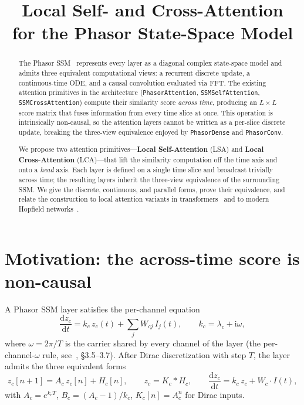 \documentclass[11pt]{article}
\title{Local Self- and Cross-Attention\\
for the Phasor State-Space Model}
\author{}
\date{}
\newcommand{\im}{\mathrm{i}}
\newcommand{\dd}{\mathrm{d}}
\theoremstyle{definition}
\begin{document}
\maketitle

\begin{abstract}
\noindent
The Phasor SSM~\cite{phasor-ssm-derivation} represents every layer as a
diagonal complex state-space model and admits three equivalent
computational views: a recurrent discrete update, a continuous-time ODE,
and a causal convolution evaluated via FFT. The existing attention
primitives in the architecture (\texttt{PhasorAttention},
\texttt{SSMSelfAttention}, \texttt{SSMCrossAttention}) compute their
similarity score \emph{across time}, producing an $L\times L$ score
matrix that fuses information from every time slice at once. This
operation is intrinsically non-causal, so the attention layers cannot be
written as a per-slice discrete update, breaking the three-view
equivalence enjoyed by \texttt{PhasorDense} and \texttt{PhasorConv}.

We propose two attention primitives---\textbf{Local Self-Attention}
(LSA) and \textbf{Local Cross-Attention} (LCA)---that lift the
similarity computation off the time axis and onto a \emph{head} axis.
Each layer is defined on a single time slice and broadcast trivially
across time; the resulting layers inherit the three-view equivalence of
the surrounding SSM. We give the discrete, continuous, and parallel
forms, prove their equivalence, and relate the construction to local
attention variants in transformers~\cite{longformer,efficient-transformers}
and to modern Hopfield networks~\cite{hopfield-is-all-you-need}.
\end{abstract}

\section{Motivation: the across-time score is non-causal}\label{sec:motivation}

A Phasor SSM layer satisfies the per-channel equation
\begin{equation}\label{eq:ssm-base}
  \frac{\dd z_c}{\dd t} = k_c\,z_c(t) + \sum_j W_{cj}\,I_j(t),
  \qquad k_c = \lambda_c + \im\omega,
\end{equation}
where $\omega = 2\pi/T$ is the carrier shared by every channel of the
layer (the per-channel-$\omega$ rule, see~\cite{phasor-ssm-derivation},
\S3.5--3.7). After Dirac discretization with step $T$, the layer admits
the three equivalent forms
\begin{equation}\label{eq:ssm-three-views}
  z_c[n+1] = A_c\,z_c[n] + H_c[n], \qquad
  z_c = K_c * H_c, \qquad
  \frac{\dd z_c}{\dd t} = k_c\,z_c + W_c \cdot I(t),
\end{equation}
with $A_c = e^{k_c T}$, $B_c = (A_c-1)/k_c$, $K_c[n] = A_c^n$ for Dirac
inputs.
\end{document}
